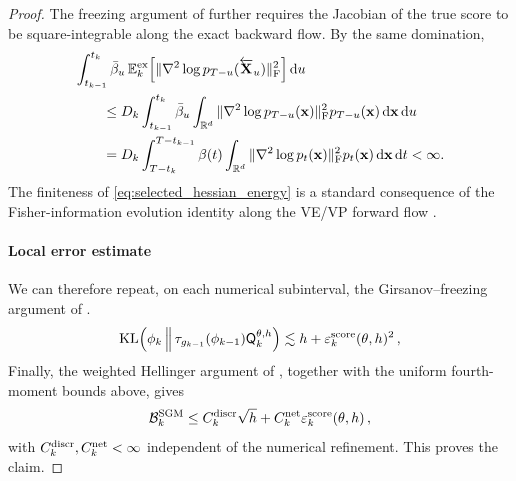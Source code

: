 \documentclass[11pt]{article}
\theoremstyle{plain}
\theoremstyle{definition}
\theoremstyle{remark}
\begin{document}
\begin{proof}
The freezing argument of
\citet[Section~H.2]{strasman2026forgetting} further requires the
Jacobian of the true score to be square-integrable along the exact
backward flow. By the same
domination,
\begin{align}
&\int_{t_{k-1}}^{t_k}
\bar{\beta}_{u}\,
\mathbb E_k^{\rm ex}\!\left[
\|\nabla^2\log p_{T-u}(\overleftarrow{\mathbf{X}}_u)\|_{\rm F}^2
\right]\mathrm{d} u
\nonumber\\
&\qquad\le
D_k
\int_{t_{k-1}}^{t_k}
\bar{\beta}_{u}
\int_{\mathbb{R}^d}
\|\nabla^2\log p_{T-u}(\mathbf{x})\|_{\rm F}^2
p_{T-u}(\mathbf{x})\,\mathrm{d}\mathbf{x}\,\mathrm{d} u
\nonumber\\
&\qquad=
D_k
\int_{T-t_k}^{T-t_{k-1}}
\beta(t)
\int_{\mathbb{R}^d}
\|\nabla^2\log p_t(\mathbf{x})\|_{\rm F}^2
p_t(\mathbf{x})\,\mathrm{d}\mathbf{x}\,\mathrm{d} t
<\infty.
\label{eq:selected_hessian_energy}
\end{align}
The finiteness of \eqref{eq:selected_hessian_energy} is a standard consequence of the Fisher-information evolution identity along the VE/VP forward flow \citep{bakry2014analysis}.



\paragraph{Local error estimate}

We can therefore repeat, on each numerical subinterval, the
Girsanov--freezing argument of \citet[Section~H.2]{strasman2026forgetting}. 
$$
\operatorname{KL}\!\left(
\filter{k}
\,\middle\|\,
\tau_{\pot{k-1}}(\filter{k-1})\mk{k}[\theta,h] \right) \lesssim h +  \varepsilon_k^{\rm score}(\theta,h)^2 \eqsp,
$$
Finally, the weighted Hellinger argument of \citet[Section~H.2]{strasman2026forgetting}, together with the uniform fourth-moment bounds above, gives
$$
\mathcal B_k^{\rm SGM} \le C_k^{\rm discr}\sqrt h + C_k^{\rm net}\varepsilon_k^{\rm score}(\theta,h) \,,
$$
with $C_k^{\rm discr},C_k^{\rm net}<\infty$ independent of the numerical refinement. This proves the claim.
\end{proof}
\end{document}
